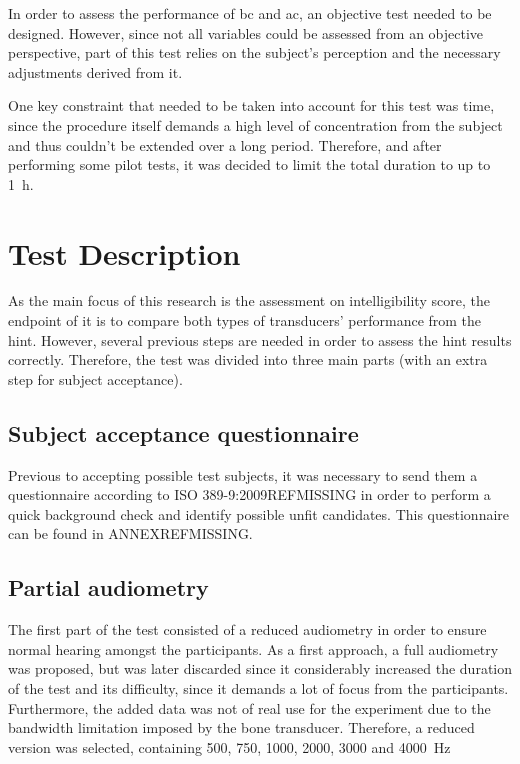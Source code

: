 In order to assess the performance of \gls{bc} and \gls{ac}, an objective test needed to be designed. However, since not all variables could be assessed from an objective perspective, part of this test relies on the subject's perception and the necessary adjustments derived from it.

One key constraint that needed to be taken into account for this test was time, since the procedure itself demands a high level of concentration from the subject and thus couldn't be extended over a long period. Therefore, and after performing some pilot tests, it was decided to limit the total duration to up to \SI{1}{\hour}.
\section{Test Description}
\label{sec:test_description}

As the main focus of this research is the assessment on intelligibility score, the endpoint of it is to compare both types of transducers' performance from the \gls{hint}. However, several previous steps are needed in order to assess the \gls{hint} results correctly. Therefore, the test was divided into three main parts (with an extra step for subject acceptance).

\subsection{Subject acceptance questionnaire}
Previous to accepting possible test subjects, it was necessary to send them a questionnaire according to ISO 389-9:2009REFMISSING	in order to perform a quick background check and identify possible unfit candidates.
This questionnaire can be found in ANNEXREFMISSING.

\subsection{Partial audiometry}
The first part of the test consisted of a reduced audiometry in order to ensure normal hearing amongst the participants. As a first approach, a full audiometry was proposed, but was later discarded since it considerably increased the duration of the test and its difficulty, since it demands a lot of focus from the participants. Furthermore, the added data was not of real use for the experiment due to the bandwidth limitation imposed by the bone transducer.
Therefore, a reduced version was selected, containing 500, 750, 1000, 2000, 3000 and \SI{4000}{\hertz}

